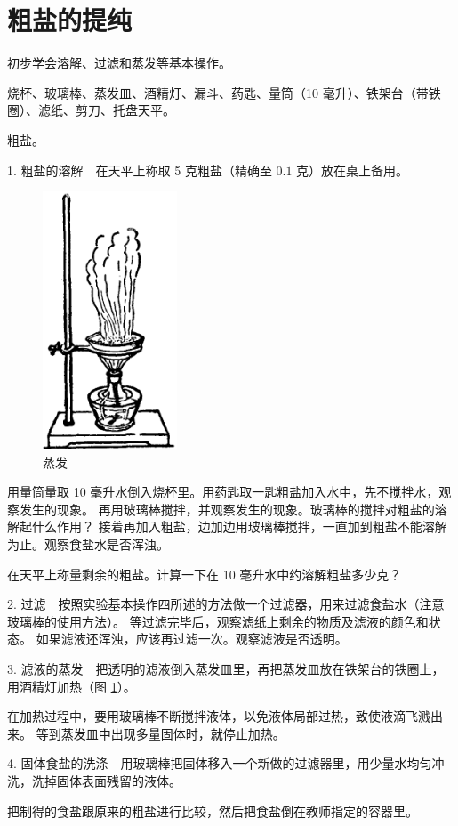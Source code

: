 \section{粗盐的提纯}\label{sec:xssy-sy1}

\begin{shiyanmudi}
    初步学会溶解、过滤和蒸发等基本操作。
\end{shiyanmudi}

\begin{shiyanyongpin}
    烧杯、玻璃棒、蒸发皿、酒精灯、漏斗、药匙、量筒（10 毫升）、铁架台（带铁圈）、滤纸、剪刀、托盘天平。

    粗盐。
\end{shiyanyongpin}

\begin{shiyanbuzhou}
    1. 粗盐的溶解　在天平上称取 5 克粗盐（精确至 $0.1$ 克）放在桌上备用。

    \begin{figure}
        \centering
        \includegraphics[width=4cm]{../pic/czhx1-xssy-16}
        \caption{蒸发}\label{fig:xssy-16}
    \end{figure}

    用量筒量取 10 毫升水倒入烧杯里。用药匙取一匙粗盐加入水中，先不搅拌水，观察发生的现象。
    再用玻璃棒搅拌，并观察发生的现象。玻璃棒的搅拌对粗盐的溶解起什么作用？
    接着再加入粗盐，边加边用玻璃棒搅拌，一直加到粗盐不能溶解为止。观察食盐水是否浑浊。

    在天平上称量剩余的粗盐。计算一下在 10 毫升水中约溶解粗盐多少克？

    2. 过滤　按照实验基本操作四所述的方法做一个过滤器，用来过滤食盐水（注意玻璃棒的使用方法）。
    等过滤完毕后，观察滤纸上剩余的物质及滤液的颜色和状态。
    如果滤液还浑浊，应该再过滤一次。观察滤液是否透明。

    3. 滤液的蒸发　把透明的滤液倒入蒸发皿里，再把蒸发皿放在铁架台的铁圈上，用酒精灯加热（图 \ref{fig:xssy-16}）。

    在加热过程中，要用玻璃棒不断搅拌液体，以免液体局部过热，致使液滴飞溅出来。
    等到蒸发皿中出现多量固体时，就停止加热。

    4. 固体食盐的洗涤　用玻璃棒把固体移入一个新做的过滤器里，用少量水均匀冲洗，洗掉固体表面残留的液体。

    把制得的食盐跟原来的粗盐进行比较，然后把食盐倒在教师指定的容器里。
\end{shiyanbuzhou}


